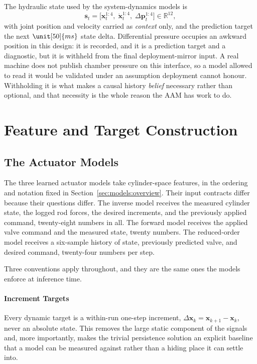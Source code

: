 The hydraulic state used by the system-dynamics models is
%
\begin{equation}
  \label{eq:data:sdstate}
  \bm{s}_t = \bigl[\bm{x}_t^{1:4},\; \dot{\bm{x}}_t^{1:4},\;
  \Delta\bm{p}_t^{1:4}\bigr] \in \mathbb{R}^{12},
\end{equation}
%
with joint position and velocity carried as \emph{context} only, and the
prediction target the next $\unit[50]{ms}$ state delta. Differential
pressure occupies an awkward position in this design: it is
recorded, and it is a prediction target and a diagnostic, but it is
withheld from the final deployment-mirror input. A real machine does not
publish chamber pressure on this interface, so a model allowed to read
it would be validated under an assumption deployment cannot honour.
Withholding it is what makes a causal history \emph{belief} necessary
rather than optional, and that necessity is the whole reason the AAM has
work to do.

\section{Feature and Target Construction}
\label{sec:data:features}

\subsection{The Actuator Models}

The three learned actuator models take cylinder-space features, in the
ordering and notation fixed in Section~\ref{sec:models:overview}. Their
input contracts differ because their questions differ. The inverse model
receives the measured cylinder state, the logged rod forces, the desired
increments, and the previously applied command, twenty-eight numbers in
all. The forward model receives the applied valve command and the
measured state, twenty numbers. The reduced-order model receives a
six-sample history of state, previously predicted valve, and desired
command, twenty-four numbers per step.

Three conventions apply throughout, and they are the same ones the models
enforce at inference time.

\paragraph{Increment Targets}
Every dynamic target is a within-run one-step increment,
$\Delta \bm{x}_k = \bm{x}_{k+1} - \bm{x}_k$, never an absolute state.
This removes the large static component of the signals and, more
importantly, makes the trivial persistence solution an explicit baseline
that a model can be measured against rather than a hiding place it can
settle into.

